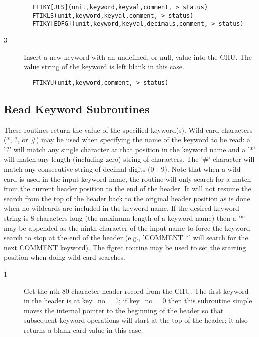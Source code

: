 \documentclass[11pt]{book}
\begin{document}
\begin{verbatim}
        FTIKY[JLS](unit,keyword,keyval,comment, > status)
        FTIKLS(unit,keyword,keyval,comment, > status)
        FTIKY[EDFG](unit,keyword,keyval,decimals,comment, > status)
\end{verbatim}

\begin{description}
\item[3 ] Insert a new keyword with an undefined, or null, value into the CHU.
   The value string of the keyword is left blank in this case.
\end{description}

\begin{verbatim}
        FTIKYU(unit,keyword,comment, > status)
\end{verbatim}

\subsection{Read Keyword Subroutines \label{FTGREC}}

These routines return the value of the specified keyword(s).  Wild card
characters (*, ?, or \#) may be used when specifying the name of the keyword
to be read: a '?' will match any single character at that position in the
keyword name and a '*' will match any length (including zero) string of
characters.  The '\#' character will match any consecutive string of
decimal digits (0 - 9). Note that when a wild card is used in the input
keyword name, the routine will only search for a match from the current
header position to the end of the header.  It will not resume the search
from the top of the header back to the original header position as is done
when no wildcards are included in the keyword name.  If the desired
keyword string is 8-characters long (the maximum length of a keyword
name) then a '*' may be appended as the ninth character of the input
name to force the keyword search to stop at the end of the header
(e.g., 'COMMENT *' will search for the next COMMENT keyword).  The
ffgrec routine may be used to set the starting position when doing
wild card searches.


\begin{description}
\item[1 ]Get the nth 80-character header record from the CHU.  The first keyword
   in the header is at key\_no = 1;  if key\_no = 0 then this subroutine
   simple moves the internal pointer to the beginning of the header
   so that subsequent keyword operations will start at the top of
  the header; it also returns a blank card value in this case.
\end{description}
\end{document}
